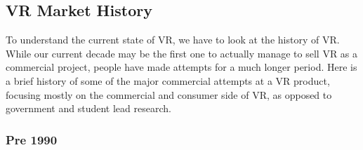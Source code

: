 \documentclass[a4paper,10pt]{article}
\begin{document}
\subsection{VR Market History}
To understand the current state of VR, we have to look at the history of VR.  While our current decade may be the first one to actually manage to sell VR as a commercial project, people have made attempts for a much longer period.  Here is a brief history of some of the major commercial attempts at a VR product, focusing mostly on the commercial and consumer side of VR, as opposed to government and student lead research.

\subsubsection{Pre 1990}
	
\end{document}
